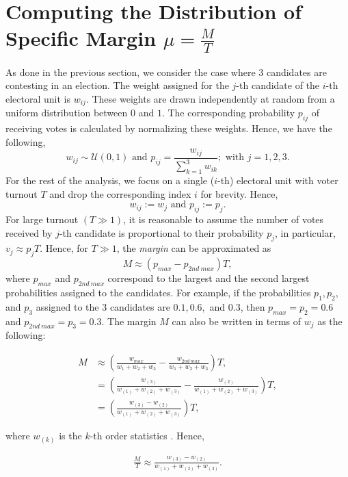 \documentclass[reprint,aps,prl,showpacs,twocolumn, superscriptaddress]{revtex4-2}
\begin{document}
\section{Computing the Distribution of Specific Margin $\mu = \frac{M}{T}$}
As done in the previous section, we consider the case where $3$ candidates are contesting in an election. The weight assigned for the $j$-th candidate of the $i$-th electoral unit is $w_{ij}$. These weights are drawn independently at random from a uniform distribution between $0$ and $1$.  The corresponding probability $p_{ij}$ of receiving votes is calculated by normalizing these weights. Hence, we have the following,
\begin{equation}
    w_{ij} \sim \mathcal{U}(0, 1) \text{ and } p_{ij} = \frac{w_{ij}}{\sum_{k=1}^3 w_{ik}}; \text{ with } j = 1, 2, 3.
\end{equation}
For the rest of the analysis, we focus on a single ($i$-th) electoral unit with voter turnout $T$ and drop the corresponding index $i$ for brevity. Hence,
\begin{equation}
    w_{ij} := w_j \text{ and } p_{ij} := p_j.
\end{equation}
For large turnout $(T \gg 1)$, it is reasonable to assume the number of votes received by $j$-th candidate is proportional to their probability $p_j$, in particular, $v_j \approx p_j T$. Hence, for $T \gg 1$, the \emph{margin} can be approximated as 
\begin{equation}
M \approx (p_{max} - p_{2nd \: max})T,
\end{equation}
where $p_{max}$ and $p_{2nd \:max}$ correspond to the largest and the second largest probabilities assigned to the candidates. For example, if the probabilities $p_1, p_2,$ and $p_3$ assigned to the 3 candidates are $0.1, 0.6,$ and $0.3$, then $p_{max} = p_2 = 0.6$ and $p_{2nd \:max} = p_3 = 0.3$. The margin $M$ can also be written in terms of $w_j$ as the following:
\begin{center}
\begin{align}
    \nonumber M &\approx \left(\frac{w_{max}}{w_1 + w_2 + w_3} - \frac{w_{2nd\:max}}{w_1 + w_2 + w_3}\right)T,\\
    \nonumber & = \left(\frac{w_{(3)}}{w_{(1)} + w_{(2)} + w_{(3)}} - \frac{w_{(2)}}{w_{(1)} + w_{(2)} + w_{(3)}}\right)T,\\
    & = \left(\frac{w_{(3)} - w_{(2)}}{w_{(1)} + w_{(2)} + w_{(3)}}\right)T,
\end{align}

\end{center}
where $w_{(k)}$ is the $k$-th order statistics \cite{BarBalNag2008}. Hence, 
\begin{center}
\begin{align}
    \frac{M}{T} \approx \frac{w_{(3)} - w_{(2)}}{w_{(1)} + w_{(2)} + w_{(3)}}.
    \label{eq:S6}
\end{align}

\end{center}
\end{document}
